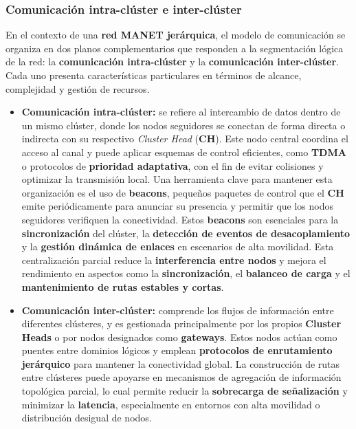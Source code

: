 \documentclass{article}
\begin{document}
\subsubsection{Comunicación intra-clúster e inter-clúster}

En el contexto de una \textbf{red MANET jerárquica}, el modelo de comunicación se organiza en dos planos complementarios que responden a la segmentación lógica de la red: la \textbf{comunicación intra-clúster} y la \textbf{comunicación inter-clúster}. Cada uno presenta características particulares en términos de alcance, complejidad y gestión de recursos.

\begin{itemize}
    \item \textbf{Comunicación intra-clúster:} se refiere al intercambio de datos dentro de un mismo clúster, donde los nodos seguidores se conectan de forma directa o indirecta con su respectivo \textit{Cluster Head} (\textbf{CH}). Este nodo central coordina el acceso al canal y puede aplicar esquemas de control eficientes, como \textbf{TDMA} o protocolos de \textbf{prioridad adaptativa}, con el fin de evitar colisiones y optimizar la transmisión local. Una herramienta clave para mantener esta organización es el uso de \textbf{beacons}, pequeños paquetes de control que el \textbf{CH} emite periódicamente para anunciar su presencia y permitir que los nodos seguidores verifiquen la conectividad. Estos \textbf{beacons} son esenciales para la \textbf{sincronización} del clúster, la \textbf{detección de eventos de desacoplamiento} y la \textbf{gestión dinámica de enlaces} en escenarios de alta movilidad. Esta centralización parcial reduce la \textbf{interferencia entre nodos} y mejora el rendimiento en aspectos como la \textbf{sincronización}, el \textbf{balanceo de carga} y el \textbf{mantenimiento de rutas estables y cortas}.

    \item \textbf{Comunicación inter-clúster:} comprende los flujos de información entre diferentes clústeres, y es gestionada principalmente por los propios \textbf{Cluster Heads} o por nodos designados como \textbf{gateways}. Estos nodos actúan como puentes entre dominios lógicos y emplean \textbf{protocolos de enrutamiento jerárquico} para mantener la conectividad global. La construcción de rutas entre clústeres puede apoyarse en mecanismos de agregación de información topológica parcial, lo cual permite reducir la \textbf{sobrecarga de señalización} y minimizar la \textbf{latencia}, especialmente en entornos con alta movilidad o distribución desigual de nodos.
\end{itemize}
\end{document}
